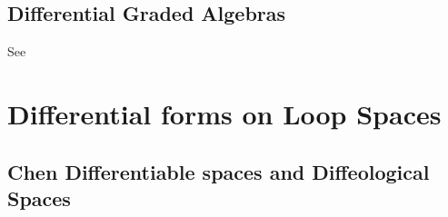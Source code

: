\documentclass{scrartcl}
\theoremstyle{plain}
\theoremstyle{definition}
\DeclareMathOperator{\Ch}{Ch}
\begin{document}

\subsection{Differential Graded Algebras}
See \cite{jf1997closed}


\section{Differential forms on Loop Spaces}
\subsection{Chen Differentiable spaces and Diffeological Spaces}



\end{document}
